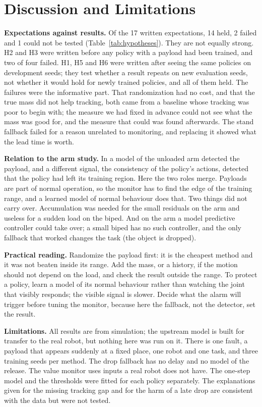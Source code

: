 \documentclass[conference]{IEEEtran}
\begin{document}
\section{Discussion and Limitations}

\textbf{Expectations against results.} Of the 17 written expectations, 14 held, 2 failed and 1 could not be tested (Table~\ref{tab:hypotheses}). They are not equally strong.
H2 and H3 were written before any policy with a payload had been trained, and two of four failed.
H1, H5 and H6 were written after seeing the same policies on development seeds; they test whether a result repeats on new evaluation seeds, not whether it would hold for newly trained policies, and all of them held.
The failures were the informative part.
That randomization had no cost, and that the true mass did not help tracking, both came from a baseline whose tracking was poor to begin with; the measure we had fixed in advance could not see what the mass was good for, and the measure that could was found afterwards.
The stand fallback failed for a reason unrelated to monitoring, and replacing it showed what the lead time is worth.

\textbf{Relation to the arm study.} In \cite{li2026arm} a model of the unloaded arm detected the payload, and a different signal, the consistency of the policy's actions, detected that the policy had left its training region.
Here the two roles merge. Payloads are part of normal operation, so the monitor has to find the edge of the training range, and a learned model of normal behaviour does that.
Two things did not carry over. Accumulation was needed for the small residuals on the arm and useless for a sudden load on the biped. And on the arm a model predictive controller could take over; a small biped has no such controller, and the only fallback that worked changes the task (the object is dropped).

\textbf{Practical reading.} Randomize the payload first: it is the cheapest method and it was not beaten inside its range. Add the mass, or a history, if the motion should not depend on the load, and check the result outside the range. To protect a policy, learn a model of its normal behaviour rather than watching the joint that visibly responds; the visible signal is slower. Decide what the alarm will trigger before tuning the monitor, because here the fallback, not the detector, set the result.

\textbf{Limitations.} All results are from simulation; the upstream model is built for transfer to the real robot, but nothing here was run on it.
There is one fault, a payload that appears suddenly at a fixed place, one robot and one task, and three training seeds per method.
The drop fallback has no delay and no model of the release.
The value monitor uses inputs a real robot does not have.
The one-step model and the thresholds were fitted for each policy separately.
The explanations given for the missing tracking gap and for the harm of a late drop are consistent with the data but were not tested.
\end{document}
